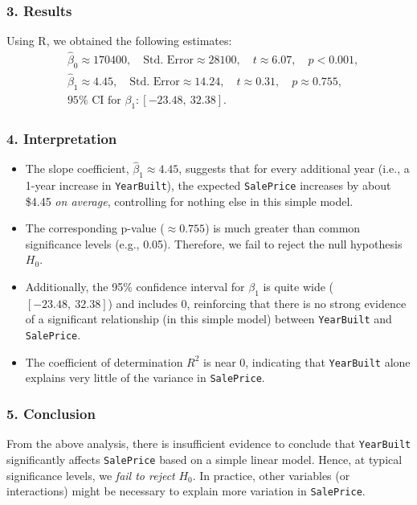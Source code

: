 \documentclass{article}
\begin{document}
\subsubsection*{3. Results}

Using R, we obtained the following estimates:
\[
\begin{aligned}
&\hat{\beta}_0 \approx 170400,
  \quad \text{Std.\ Error} \approx 28100,
  \quad t \approx 6.07,
  \quad p < 0.001, \\
&\hat{\beta}_1 \approx 4.45,
  \quad \text{Std.\ Error} \approx 14.24,
  \quad t \approx 0.31,
  \quad p \approx 0.755, \\
& 95\%\text{ CI for } \beta_1: [-23.48,\ 32.38].
\end{aligned}
\]

\subsubsection*{4. Interpretation}

\begin{itemize}
    \item The slope coefficient, \(\hat{\beta}_1\approx 4.45\), suggests that for every additional year (i.e., a 1-year increase in \texttt{YearBuilt}), the expected \texttt{SalePrice} increases by about \$4.45 \textit{on average}, controlling for nothing else in this simple model.
    \item The corresponding p-value (\(\approx 0.755\)) is much greater than common significance levels (e.g., 0.05). Therefore, we fail to reject the null hypothesis \(H_0\). 
    \item Additionally, the 95\% confidence interval for \(\beta_1\) is quite wide (\([-23.48,\ 32.38]\)) and includes 0, reinforcing that there is no strong evidence of a significant relationship (in this simple model) between \texttt{YearBuilt} and \texttt{SalePrice}.
    \item The coefficient of determination \(R^2\) is near 0, indicating that \texttt{YearBuilt} alone explains very little of the variance in \texttt{SalePrice}.
\end{itemize}

\subsubsection*{5. Conclusion}
From the above analysis, there is insufficient evidence to conclude that \texttt{YearBuilt} significantly affects \texttt{SalePrice} based on a simple linear model. Hence, at typical significance levels, we \emph{fail to reject} \(H_0\). In practice, other variables (or interactions) might be necessary to explain more variation in \texttt{SalePrice}.
\end{document}
